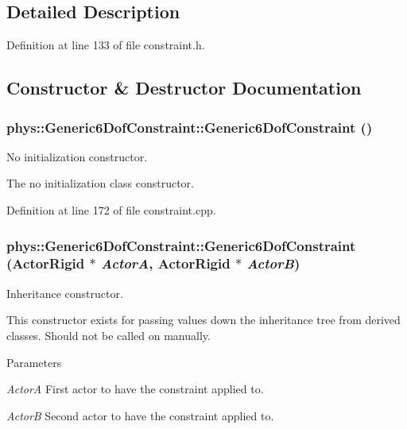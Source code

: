 \subsection{Detailed Description}


Definition at line 133 of file constraint.h.



\subsection{Constructor \& Destructor Documentation}
\hypertarget{classphys_1_1Generic6DofConstraint_ab897b1d7f04073cae60cf1d2615d04b4}{
\subsubsection[{Generic6DofConstraint}]{\setlength{\rightskip}{0pt plus 5cm}phys::Generic6DofConstraint::Generic6DofConstraint ()}}
\label{de/d2a/classphys_1_1Generic6DofConstraint_ab897b1d7f04073cae60cf1d2615d04b4}


No initialization constructor. 

The no initialization class constructor. 

Definition at line 172 of file constraint.cpp.

\hypertarget{classphys_1_1Generic6DofConstraint_aae8cea56ac1d384d326a089e48842cbc}{
\subsubsection[{Generic6DofConstraint}]{\setlength{\rightskip}{0pt plus 5cm}phys::Generic6DofConstraint::Generic6DofConstraint ({\bf ActorRigid} $\ast$ {\em ActorA}, \/  {\bf ActorRigid} $\ast$ {\em ActorB})}}
\label{de/d2a/classphys_1_1Generic6DofConstraint_aae8cea56ac1d384d326a089e48842cbc}


Inheritance constructor. 

This constructor exists for passing values down the inheritance tree from derived classes. Should not be called on manually. 
\begin{DoxyParams}{Parameters}
\item[{\em ActorA}]First actor to have the constraint applied to. \item[{\em ActorB}]Second actor to have the constraint applied to. \end{DoxyParams}


